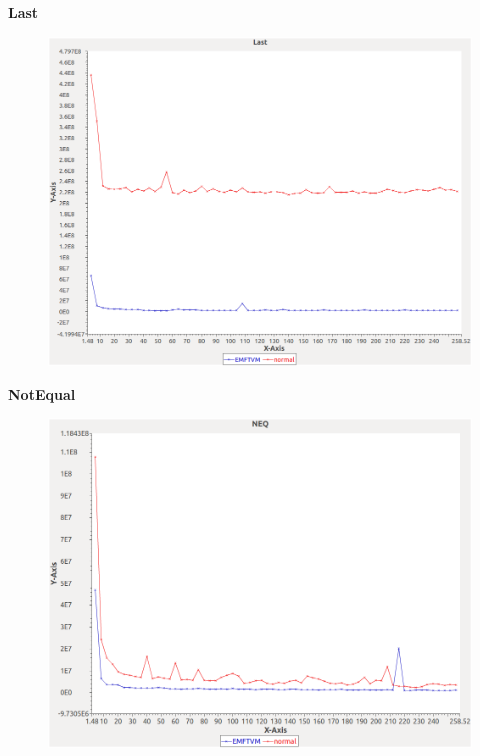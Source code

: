 \noindent\textbf{Last}

\begin{figure}[h]
\centering
\includegraphics[width=\textwidth]{graphs/sequence/Last}
\end{figure}
\pagebreak

\noindent\textbf{NotEqual}

\begin{figure}[h]
\centering
\includegraphics[width=\textwidth]{graphs/sequence/NEQ}
\end{figure}
\pagebreak

